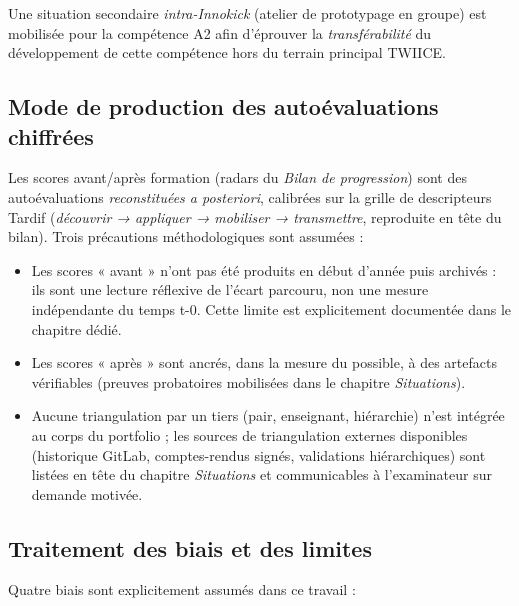 Une situation secondaire \emph{intra-Innokick} (atelier de prototypage en groupe) est mobilisée pour la compétence A2 afin d'éprouver la \emph{transférabilité} du développement de cette compétence hors du terrain principal TWIICE.

\subsection*{Mode de production des autoévaluations chiffrées}

Les scores avant/après formation (radars du \emph{Bilan de progression}) sont des autoévaluations \emph{reconstituées a posteriori}, calibrées sur la grille de descripteurs Tardif (\emph{découvrir → appliquer → mobiliser → transmettre}, reproduite en tête du bilan). Trois précautions méthodologiques sont assumées :

\begin{itemize}
    \item Les scores « avant » n'ont pas été produits en début d'année puis archivés : ils sont une lecture réflexive de l'écart parcouru, non une mesure indépendante du temps t-0. Cette limite est explicitement documentée dans le chapitre dédié.
    \item Les scores « après » sont ancrés, dans la mesure du possible, à des artefacts vérifiables (preuves probatoires mobilisées dans le chapitre \emph{Situations}).
    \item Aucune triangulation par un tiers (pair, enseignant, hiérarchie) n'est intégrée au corps du portfolio ; les sources de triangulation externes disponibles (historique GitLab, comptes-rendus signés, validations hiérarchiques) sont listées en tête du chapitre \emph{Situations} et communicables à l'examinateur sur demande motivée.
\end{itemize}

\subsection*{Traitement des biais et des limites}

Quatre biais sont explicitement assumés dans ce travail :

